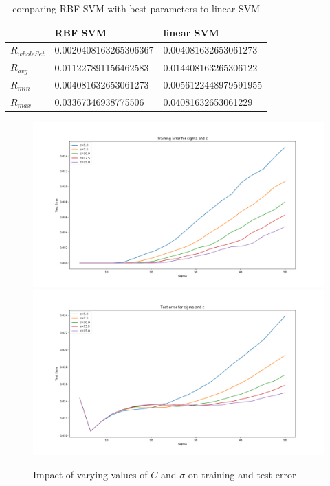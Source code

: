 \begin{table}[!h]
 \begin{center}
\begin{tabular}{|l|l|l|}
 \hline
 & \textbf{RBF SVM} & \textbf{linear SVM} \\
 \hline
  \textbf{$R_{whole Set}$} & 0.0020408163265306367       &     0.004081632653061273      \\
 \hline
  \hline
 \textbf{$R_{avg}$} & 0.011227891156462583       &     0.014408163265306122      \\
 \hline
 \textbf{$R_{min}$} & 0.004081632653061273       &     0.0056122448979591955      \\
 \hline
  \textbf{$R_{max}$} & 0.03367346938775506       &     0.04081632653061229      \\
 \hline
 
\end{tabular}
\caption{\label{tab:results} comparing RBF SVM with best parameters to linear SVM }
\end{center}
\end{table}



\begin{figure}[!h]
\begin{center}
\centering
\includegraphics[width=1\textwidth]{figures/new/3_Figure_4}
\includegraphics[width=1\textwidth]{figures/new/3_Figure_3}
\end{center}
\caption{\label{fig:3_3} Impact of varying values of $C$ and $\sigma$ on training and test error  }
\end{figure}

